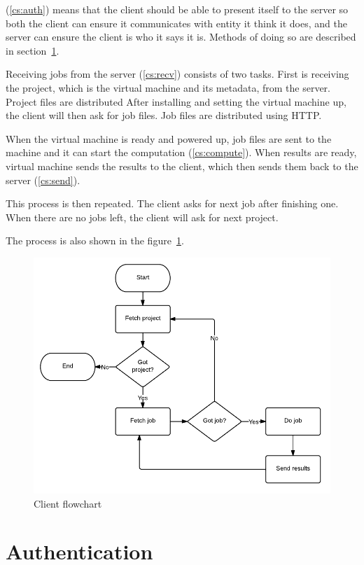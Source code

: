 (\ref{cs:auth}) means that the client should be able to present itself to the server so both the client can ensure it communicates with entity it think it does, and the server can ensure the client is who it says it is. Methods of doing so are described in section~\ref{s:authentication}.

Receiving jobs from the server (\ref{cs:recv}) consists of two tasks. First is receiving the project, which is the virtual machine and its metadata, from the server. Project files are distributed  After installing and setting the virtual machine up, the client will then ask for job files. Job files are distributed using HTTP.

When the virtual machine is ready and powered up, job files are sent to the machine and it can start the computation (\ref{cs:compute}). When results are ready, virtual machine sends the results to the client, which then sends them back to the server (\ref{cs:send}).

This process is then repeated. The client asks for next job after finishing one. When there are no jobs left, the client will ask for next project.

The process is also shown in the figure~\ref{f:clientflow}.

\begin{figure}
\centering
\includegraphics{diagrams/ClientFlowchart.pdf}
\caption{Client flowchart}
\label{f:clientflow}
\end{figure}

\section{Authentication}
\label{s:authentication}

